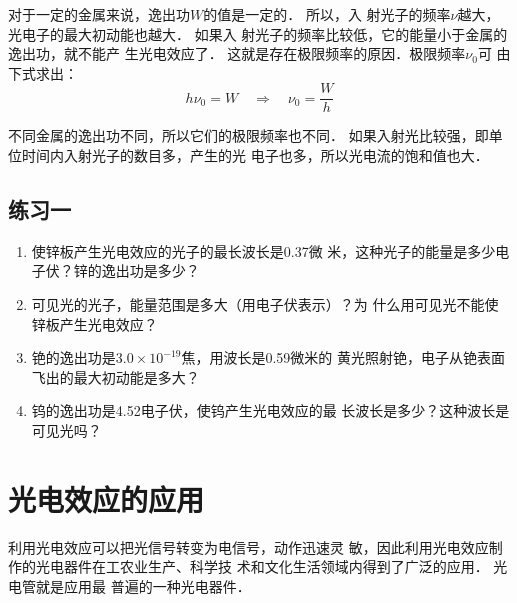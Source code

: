 对于一定的金属来说，逸出功$W$的值是一定的．
所以，入
射光子的频率$\nu$越大，光电子的最大初动能也越大．
如果入
射光子的频率比较低，它的能量小于金属的逸出功，就不能产
生光电效应了．
这就是存在极限频率的原因．极限频率$\nu_0$可
由下式求出：
\[h\nu_0=W\quad \Rightarrow\quad \nu_0=\frac{W}{h} \]

不同金属的逸出功不同，所以它们的极限频率也不同．
如果入射光比较强，即单位时间内入射光子的数目多，产生的光
电子也多，所以光电流的饱和值也大．

\subsection*{练习一}

\begin{enumerate}
    \item 使锌板产生光电效应的光子的最长波长是0.37微
米，这种光子的能量是多少电子伏？锌的逸出功是多少？
\item 可见光的光子，能量范围是多大（用电子伏表示）？为
什么用可见光不能使锌板产生光电效应？
\item 铯的逸出功是$3.0\times10^{-19}$焦，用波长是0.59微米的
黄光照射铯，电子从铯表面飞出的最大初动能是多大？
\item 钨的逸出功是4.52电子伏，使钨产生光电效应的最
长波长是多少？这种波长是可见光吗？
\end{enumerate}

\section{光电效应的应用}

利用光电效应可以把光信号转变为电信号，动作迅速灵
敏，因此利用光电效应制作的光电器件在工农业生产、科学技
术和文化生活领域内得到了广泛的应用．
光电管就是应用最
普遍的一种光电器件．

